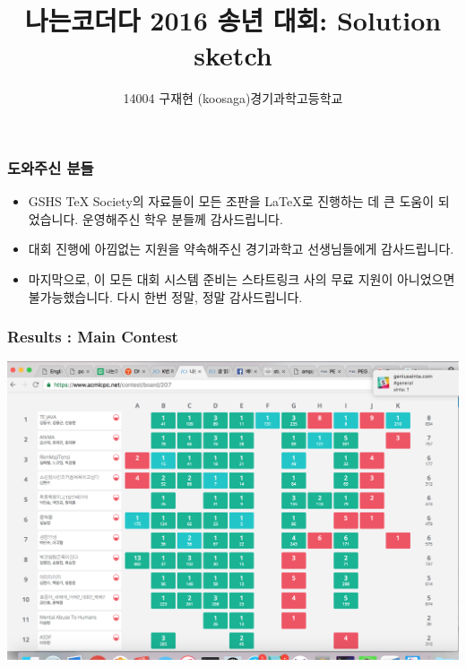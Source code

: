 \documentclass{beamer}
\begin{document}
	
	\begin{frame}
		\title{나는코더다 2016 송년 대회: Solution sketch}
		\author{14004 구재현 (koosaga)\newline 경기과학고등학교}
		\date{}
		\titlepage
	\end{frame}
	
	\begin{frame}
		\frametitle{도와주신 분들}
		\begin{itemize}
			\item GSHS TeX Society의 자료들이 모든 조판을 \LaTeX 로 진행하는 데 큰 도움이 되었습니다. 운영해주신 학우 분들께 감사드립니다.
			\item 대회 진행에 아낌없는 지원을 약속해주신 경기과학고 선생님들에게 감사드립니다.
			\item 마지막으로, 이 모든 대회 시스템 준비는 스타트링크 사의 무료 지원이 아니었으면 불가능했습니다. 다시 한번 정말, 정말 감사드립니다. 
		\end{itemize}
	\end{frame}

	\begin{frame}
		\frametitle{Results : Main Contest}
		\includegraphics[scale=0.27]{IMG_2.png}
	\end{frame}
\end{document}
